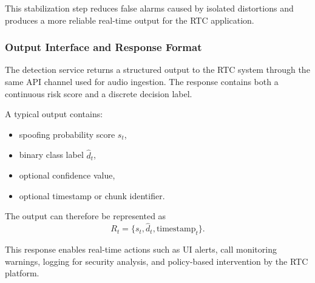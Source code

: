 This stabilization step reduces false alarms caused by isolated distortions and produces a more reliable real-time output for the RTC application.

\subsubsection{Output Interface and Response Format}

The detection service returns a structured output to the RTC system through the same API channel used for audio ingestion. The response contains both a continuous risk score and a discrete decision label.

A typical output contains:
\begin{itemize}
    \item spoofing probability score \(s_t\),
    \item binary class label \(\hat{d}_t\),
    \item optional confidence value,
    \item optional timestamp or chunk identifier.
\end{itemize}

The output can therefore be represented as
\begin{equation}
R_t = \{s_t, \hat{d}_t, \text{timestamp}_t\}.
\end{equation}

This response enables real-time actions such as UI alerts, call monitoring warnings, logging for security analysis, and policy-based intervention by the RTC platform.